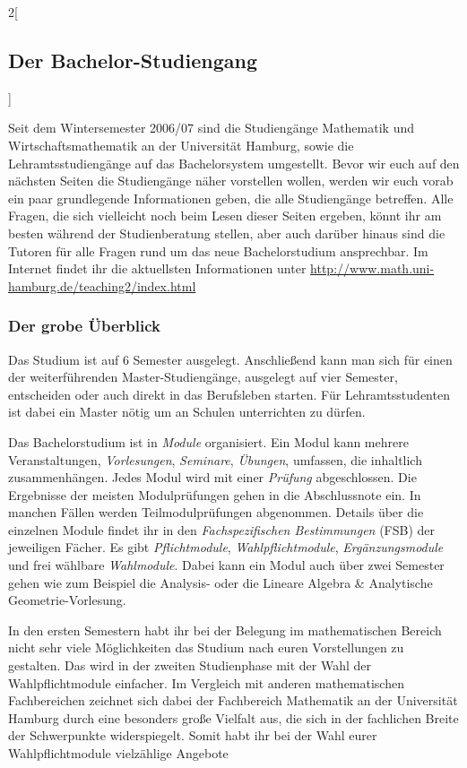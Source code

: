 \begin{multicols}{2}[\subsection{Der Bachelor-Studiengang}]

Seit dem Wintersemester 2006/07 sind die Studiengänge Mathematik und
Wirtschaftsmathematik an der Universität Hamburg, sowie die
Lehramtsstudiengänge auf das Bachelorsystem umgestellt.  Bevor wir euch auf den
nächsten Seiten die Studiengänge näher vorstellen wollen, werden wir euch vorab
ein paar grundlegende Informationen geben, die alle Studiengänge betreffen.
Alle Fragen, die sich vielleicht noch beim Lesen dieser Seiten ergeben, könnt
ihr am besten während der Studienberatung stellen, aber auch darüber hinaus
sind die Tutoren für alle Fragen rund um das neue Bachelorstudium ansprechbar.
Im Internet findet ihr die aktuellsten Informationen unter
\url{http://www.math.uni-hamburg.de/teaching2/index.html}

\subsubsection{Der grobe Überblick}

Das Studium ist auf 6 Semester ausgelegt. Anschließend kann man sich für einen
der weiterführenden Master-Studiengänge, ausgelegt auf vier Semester,
entscheiden oder auch direkt in das Berufsleben starten. Für Lehramtsstudenten
ist dabei ein Master nötig um an Schulen unterrichten zu dürfen.

Das Bachelorstudium ist in \emph{Module} organisiert. Ein Modul kann mehrere
Veranstaltungen, \emph{Vorlesungen}, \emph{Seminare}, \emph{Übungen}, umfassen,
die inhaltlich zusammenhängen.  Jedes Modul wird mit einer \emph{Prüfung}
abgeschlossen.  Die Ergebnisse der meisten Modulprüfungen gehen in die
Abschlussnote ein. In manchen Fällen werden Teilmodulprüfungen abgenommen.
Details über die einzelnen Module findet ihr in den \emph{Fachspezifischen
Bestimmungen} (FSB) der jeweiligen Fächer.  Es gibt \emph{Pflichtmodule},
\emph{Wahlpflichtmodule}, \emph{Ergänzungsmodule} und frei wählbare
\emph{Wahlmodule}.  Dabei kann ein Modul auch über zwei Semester gehen wie zum
Beispiel die Analysis- oder die Lineare Algebra \& Analytische
Geometrie-Vorlesung. 

In den ersten Semestern habt ihr bei der Belegung im mathematischen Bereich
nicht sehr viele Möglichkeiten das Studium nach euren Vorstellungen zu
gestalten.  Das wird in der zweiten Studienphase mit der Wahl der
Wahlpflichtmodule einfacher.  Im Vergleich mit anderen mathematischen
Fachbereichen zeichnet sich dabei der Fachbereich Mathematik an der Universität
Hamburg durch eine besonders große Vielfalt aus, die sich in der fachlichen
Breite der Schwerpunkte widerspiegelt. Somit habt ihr bei der Wahl eurer
Wahlpflichtmodule vielzählige Angebote


\end{multicols}
